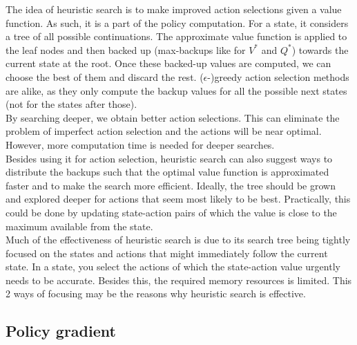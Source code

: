 \documentclass[a4paper]{article}
\begin{document}
The idea of heuristic search is to make improved action selections given a value function. As such, it is a part of the policy computation. For a state, it considers a tree of all possible continuations. The approximate value function is applied to the leaf nodes and then backed up (max-backups like for $V^{*}$ and $Q^{*}$) towards the current state at the root. Once these backed-up values are computed, we can choose the best of them and discard the rest. ($\epsilon$-)greedy action selection methods are alike, as they only compute the backup values for all the possible next states (not for the states after those).\\
By searching deeper, we obtain better action selections. This can eliminate the problem of imperfect action selection and the actions will be near optimal. However, more computation time is needed for deeper searches.\\
Besides using it for action selection, heuristic search can also suggest ways to distribute the backups such that the optimal value function is approximated faster and to make the search more efficient. Ideally, the tree should be grown and explored deeper for actions that seem most likely to be best. Practically, this could be done by updating state-action pairs of which the value is close to the maximum available from the state.\\
Much of the effectiveness of heuristic search is due to its search tree being tightly focused on the states and actions that might immediately follow the current state. In a state, you select the actions of which the state-action value urgently needs to be accurate. Besides this, the required memory resources is limited. This 2 ways of focusing may be the reasons why heuristic search is effective.

\subsection{Policy gradient}
\end{document}
